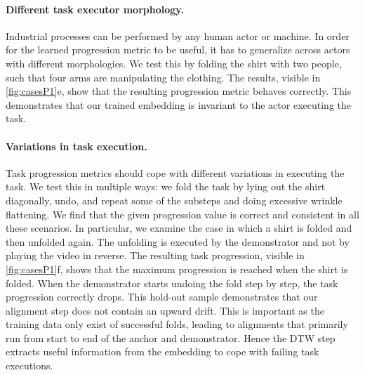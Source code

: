 \documentclass[\home/main.tex]{subfiles}
\begin{document}
\paragraph{Different task executor morphology.}
Industrial processes can be performed by any human actor or machine. In order for the learned progression metric to be useful, it has to generalize across actors with different morphologies. We test this by folding the shirt with two people, such that four arms are manipulating the clothing. The results, visible in \cref{fig:casesP1}e, show that the resulting progression metric behaves correctly. This demonstrates that our trained embedding is invariant to the actor executing the task.

\paragraph{Variations in task execution.}
Task progression metrics should cope with different variations in executing the task. We test this in multiple ways: we fold the task by lying out the shirt diagonally, undo, and repeat some of the substeps and doing excessive wrinkle flattening. We find that the given progression value is correct and consistent in all these scenarios. In particular, we examine the case in which a shirt is folded and then unfolded again. The unfolding is executed by the demonstrator and not by playing the video in reverse. The resulting task progression, visible in \cref{fig:casesP1}f, shows that the maximum progression is reached when the shirt is folded. When the demonstrator starts undoing the fold step by step, the task progression correctly drops. This hold-out sample demonstrates that our alignment step does not contain an upward drift. This is important as the training data only exist of successful folds, leading to alignments that primarily run from start to end of the anchor and demonstrator. Hence the DTW step extracts useful information from the embedding to cope with failing task executions.
\end{document}
